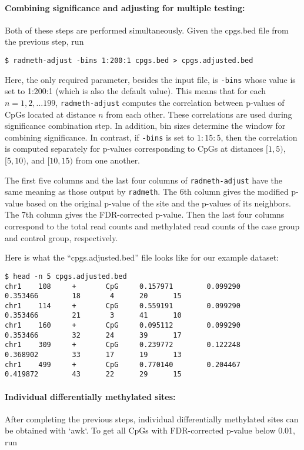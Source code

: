 \documentclass[10pt]{article}
\begin{document}
\paragraph{Combining significance and adjusting for multiple testing:} Both
of these steps are performed simultaneously. Given the cpgs.bed file from
the previous step, run
\begin{verbatim}
$ radmeth-adjust -bins 1:200:1 cpgs.bed > cpgs.adjusted.bed
\end{verbatim}%
Here, the only required parameter, besides the input file, is {\tt -bins}
whose value is set to 1:200:1 (which is also the default value). This means
that for  each $n = 1, 2, . . . 199$, {\tt radmeth-adjust} computes the
correlation between p-values of CpGs located at distance $n$ from each other.
These correlations are used during significance combination step. In
addition, bin sizes determine the window for combining significance. In
contrast, if {\tt -bins} is set to $1:15:5$, then the correlation is computed
separately for p-values corresponding to CpGs at distances $[1, 5)$, $[5,
10)$, and $[10, 15)$ from one another.

The first five columns and the last four columns of {\tt radmeth-adjust} have
the same meaning as those output by {\tt radmeth}. The 6th column
gives the modified p-value based on the original p-value of the site and the
p-values of its neighbors. The 7th column gives the FDR-corrected p-value.
Then the last four columns correspond to the total read counts and
methylated read counts of the case group and control group, respectively.

Here is what the ``cpgs.adjusted.bed'' file looks like for our example dataset:

{\small{%
\begin{verbatim}
$ head -n 5 cpgs.adjusted.bed
chr1    108     +       CpG     0.157971        0.099290        0.353466        18       4      20      15
chr1    114     +       CpG     0.559191        0.099290        0.353466        21       3      41      10
chr1    160     +       CpG     0.095112        0.099290        0.353466        32      24      39      17
chr1    309     +       CpG     0.239772        0.122248        0.368902        33      17      19      13
chr1    499     +       CpG     0.770140        0.204467        0.419872        43      22      29      15
\end{verbatim}%
}}

\paragraph{Individual differentially methylated sites:} After completing the
previous steps, individual differentially methylated sites can be obtained with
`awk`. To get all CpGs with FDR-corrected p-value below 0.01, run
\end{document}
